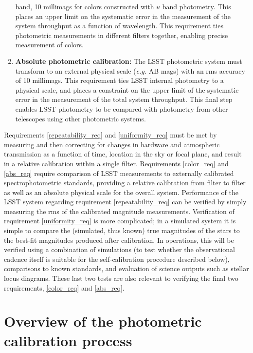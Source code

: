 \documentclass[12pt,preprint]{aastex}
\begin{document}
\begin{enumerate}
{band, 10 millimags for colors constructed with $u$ band
photometry. This places an upper limit on the systematic error in
the measurement of the system throughput as a function of
wavelength. This requirement ties photometric measurements in
different filters together, enabling precise measurement of colors. 
\label{color_req}}
\item{{\bf Absolute photometric calibration:} The LSST photometric
system must transform to an external physical scale ({\it e.g.} AB
mags) with an rms accuracy of 10 millimags. This requirement ties LSST internal
photometry to a physical scale, and places a constraint on the upper
limit of the systematic error in the measurement of the total system
throughput. This final step enables LSST photometry to be compared
with photometry from other telescopes using other photometric
systems. \label{abs_req}}
\end{enumerate}

Requirements \ref{repeatability_req} and \ref{uniformity_req} must be
met by measuring and then correcting for changes in hardware and
atmospheric transmission as a function of time, location in the sky or
focal plane, and result in a relative calibration within a single
filter. Requirements \ref{color_req} and \ref{abs_req} require
comparison of LSST measurements to externally calibrated
spectrophotometric standards, providing a relative calibration from
filter to filter as well as an absolute physical scale for the overall
system.  Performance of the LSST system regarding requirement
\ref{repeatability_req} can be verified by simply measuring the rms of
the calibrated magnitude measurements. Verification of requirement
\ref{uniformity_req} is more complicated; in a simulated system it is
simple to compare the (simulated, thus known) true magnitudes of the
stars to the best-fit magnitudes produced after calibration. In
operations, this will be verified using a combination of simulations
(to test whether the observational cadence itself is suitable for the
self-calibration procedure described below), comparisons to known
standards, and evaluation of science outputs such as stellar locus
diagrams. These last two tests are also relevant to verifying the
final two requirements, \ref{color_req} and \ref{abs_req}.


\section{Overview of the photometric calibration process}
\label{sec:calib_overview}
\end{document}
